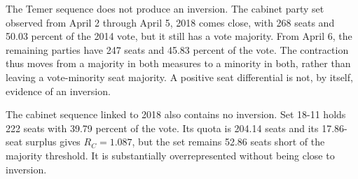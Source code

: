 \documentclass[11pt]{article}
\begin{document}

The Temer sequence does not produce an inversion. The cabinet party set
observed from April 2 through April 5, 2018 comes close, with 268 seats
and 50.03 percent of the 2014 vote, but it still has a vote majority.
From April 6, the remaining parties have 247 seats and 45.83 percent of
the vote. The contraction thus moves from a majority in both measures
to a minority in both, rather than leaving a vote-minority seat majority.
A positive seat differential is not, by itself, evidence of an inversion.


The cabinet sequence linked to 2018 also contains no inversion. Set 18-11
holds 222 seats with 39.79 percent of the vote. Its quota is 204.14 seats and its
17.86-seat surplus gives $R_C=1.087$, but the set remains 52.86 seats short of
the majority threshold. It is substantially overrepresented without being close
to inversion.
\end{document}
